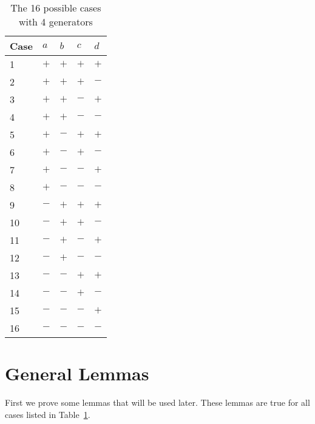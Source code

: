 \begin{table}[ht]
\begin{center}
\begin{tabular}{l | l | l | l | l}
Case\hspace{10 pt} & $a$\hspace{10 pt} & $b$\hspace{10 pt} & $c$\hspace{10 pt} & $d$\hspace{10 pt} \\\hline\hline
1 & $+$ & $+$ & $+$ & $+$ \\\hline
2 & $+$ & $+$ & $+$ & $-$ \\\hline
3 & $+$ & $+$ & $-$ & $+$ \\\hline
4 & $+$ & $+$ & $-$ & $-$ \\\hline
5 & $+$ & $-$ & $+$ & $+$ \\\hline
6 & $+$ & $-$ & $+$ & $-$ \\\hline
7 & $+$ & $-$ & $-$ & $+$ \\\hline
8 & $+$ & $-$ & $-$ & $-$ \\\hline
9 & $-$ & $+$ & $+$ & $+$ \\\hline
10 & $-$ & $+$ & $+$ & $-$ \\\hline
11 & $-$ & $+$ & $-$ & $+$ \\\hline
12 & $-$ & $+$ & $-$ & $-$ \\\hline
13 & $-$ & $-$ & $+$ & $+$ \\\hline
14 & $-$ & $-$ & $+$ & $-$ \\\hline
15 & $-$ & $-$ & $-$ & $+$ \\\hline
16 & $-$ & $-$ & $-$ & $-$ 
\end{tabular}
\end{center}
\caption{The 16 possible cases with 4 generators}
\label{table:casesAll}
\end{table}

\section{General Lemmas}
\label{section:generalLemmas}

\noindent{}First we prove some lemmas that will be used later. These lemmas are true for all cases listed in Table~\ref{table:casesAll}.

